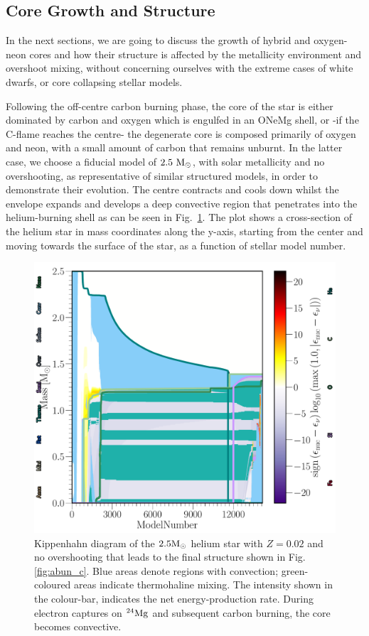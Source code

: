 \documentclass[../../main/thesis_msc.tex]{subfiles}
\begin{document}
    \subsection{Core Growth and Structure} \label{sec:coreGrowth}
    
    In the next sections, we are going to discuss the growth of hybrid and oxygen-neon cores and how their structure is affected by the metallicity environment and overshoot mixing, without concerning ourselves with the extreme cases of white dwarfs, or core collapsing stellar models.
    
    Following the off-centre carbon burning phase, the core of the star is either dominated by carbon and oxygen which is engulfed in an ONeMg shell, or -if the C-flame reaches the centre- the degenerate core is composed primarily of oxygen and neon, with a small amount of carbon that remains unburnt. In the latter case, we choose a fiducial model of $\rm 2.5 \ M_{\odot}$, with solar metallicity and no overshooting, as representative of similar structured models, in order to demonstrate their evolution. The centre contracts and cools down whilst the envelope expands and develops a deep convective region that penetrates into the helium-burning shell as can be seen in Fig.\, \ref{fig:Kipp}. The plot shows a cross-section of the helium star in mass coordinates along the y-axis, starting from the center and moving towards the surface of the star, as a function of stellar model number.
    
    
    
    \begin{figure}[t]
        \centering
        \includegraphics[width=0.5\columnwidth]{../figures/chapter4/Kipp_2p5_0p02_0p0.pdf}
        \caption{Kippenhahn diagram of the $2.5 \rm M_{\odot}$ helium star with $Z = 0.02$ and no overshooting that leads to the final structure shown in Fig.\, \ref{fig:abun_c}. Blue areas denote regions with convection; green-coloured areas indicate thermohaline mixing. The intensity shown in the colour-bar, indicates the net energy-production rate. During electron captures on $\rm ^{24}Mg$ and subsequent carbon burning, the core becomes convective.}
        \label{fig:Kipp}
    \end{figure}
    
\end{document}
